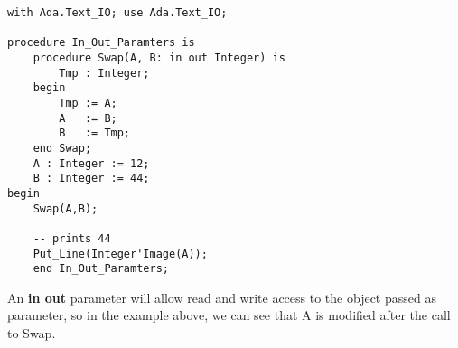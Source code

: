 \documentclass[paper=a4, fontsize=11pt]{scrartcl} %
\numberwithin{equation}{section} %
\numberwithin{figure}{section} %
\numberwithin{table}{section} %
\begin{document}
\begin{lstlisting}[caption = {main.adb}, label = {main_adb}]
with Ada.Text_IO; use Ada.Text_IO;

procedure In_Out_Paramters is
	procedure Swap(A, B: in out Integer) is 
		Tmp : Integer;
	begin 
		Tmp := A; 
		A   := B;
		B   := Tmp;
	end Swap;
	A : Integer := 12;
	B : Integer := 44;
begin 
	Swap(A,B);

	-- prints 44
	Put_Line(Integer'Image(A));
	end In_Out_Paramters;
\end{lstlisting}

An \textbf{in out} parameter will allow read and write access to the object passed as parameter, so in the example above, we can see that A is modified after the call to Swap.
\end{document}

